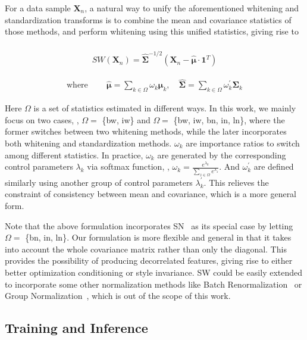 \documentclass[10pt,twocolumn,letterpaper]{article}
\begin{document}
For a data sample \(\mathbf{X}_n\), a natural way to unify the aforementioned whitening and standardization transforms is to combine the mean and covariance statistics of those methods, and perform whitening using this unified statistics, giving rise to
~\\
\begin{align}
SW(\mathbf{X}_n) = \hat{\bm{\Sigma}}^{-1/2}(\mathbf{X}_n - \hat{\bm{\mu}} \cdot \mathbf{1}^T)
\end{align}
\begin{fleqn}
\begin{align}
\text{where} \qquad\ 
\hat{\bm{\mu}} = \sum_{k \in \Omega}\omega_{k} \bm{\mu}_{k}, \quad
\hat{\bm{\Sigma}} = \sum_{k \in \Omega}\omega_{k}^{\prime} \bm{\Sigma}_{k}
\end{align}
\end{fleqn}
Here \(\Omega\) is a set of statistics estimated in different ways.
In this work, we mainly focus on two cases, \ie, \(\Omega = \) \{bw, iw\} and \(\Omega = \) \{bw, iw, bn, in, ln\}, where the former switches between two whitening methods, while the later incorporates both whitening and standardization methods.
\(\omega_k\) are importance ratios to switch among different statistics.
In practice, \(\omega_k\) are generated by the corresponding control parameters \(\lambda_k\) via softmax function, \ie, \(\omega_k = \frac{e^{\lambda_k}}{\sum_{z \in \Omega} e^{\lambda_z}}\).
And \(\omega_{k}^{\prime}\) are defined similarly using another group of control parameters \(\lambda_{k}^{\prime}\).
This relieves the constraint of consistency between mean and covariance, which is a more general form.

Note that the above formulation incorporates SN~\cite{luo2018differentiable} as its special case by letting \(\Omega = \) \{bn, in, ln\}.
Our formulation is more flexible and general in that it takes into account the whole covariance matrix rather than only the diagonal.
This provides the possibility of producing decorrelated features, giving rise to either better optimization conditioning or style invariance.
SW could be easily extended to incorporate some other normalization methods like Batch Renormalization~\cite{ioffe2017batch} or Group Normalization~\cite{wu2018group}, which is out of the scope of this work.





\subsection{Training and Inference}
\end{document}
